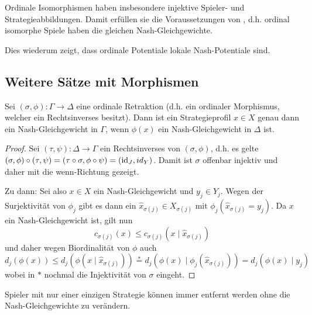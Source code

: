 \begin{bsp}
	Ordinale Isomorphismen haben insbesondere injektive Spieler- und Strategieabbildungen. Damit erfüllen sie die Voraussetzungen von , d.h. ordinal isomorphe Spiele haben die gleichen Nash-Gleichgewichte.
\end{bsp}

Dies wiederum zeigt, dass ordinale Potentiale lokale Nash-Potentiale sind.


\subsection{Weitere Sätze mit Morphismen}



\begin{prop}\label{prop:NGerhalten}
	Sei $(\sigma, \phi): \Gamma \to \Delta$ eine ordinale Retraktion (d.h. ein ordinaler Morphismus, welcher ein Rechtsinverses besitzt). Dann ist ein Strategieprofil $x \in X$ genau dann ein Nash-Gleichgewicht in $\Gamma$, wenn $\phi(x)$ ein Nash-Gleichgewicht in $\Delta$ ist.
\end{prop}

\begin{proof}
	Sei $(\tau, \psi): \Delta \to \Gamma$ ein Rechtsinverses von $(\sigma, \phi)$, d.h. es gelte $(\sigma, \phi) \circ (\tau, \psi) = (\tau\circ\sigma, \phi\circ\psi) = (\mathrm{id}_J, id_Y)$. Damit ist $\sigma$ offenbar injektiv und daher mit  die \glqq wenn\grqq-Richtung gezeigt.
	
	Zu \glqq dann\grqq: Sei also $x \in X$ ein Nash-Gleichgewicht und $y_j \in Y_j$. Wegen der Surjektivität von $\phi_j$ gibt es dann ein $\hat{x}_{\sigma(j)} \in X_{\sigma(j)}$ mit $\phi_j(\hat{x}_{\sigma(j)} = y_j)$. Da $x$ ein Nash-Gleichgewicht ist, gilt nun 
	\[c_{\sigma(j)}(x) \leq c_{\sigma(j)}(x \mid \hat{x}_{\sigma(j)})\]
	und daher wegen Biordinalität von $\phi$ auch 
	\[d_j(\phi(x)) \leq d_j(\phi(x \mid \hat{x}_{\sigma(j)})) \overset{\ast}{=} d_j(\phi(x) \mid \phi_j(\hat{x}_{\sigma(j)})) = d_j(\phi(x) \mid y_j)\]
	wobei in $\ast$ nochmal die Injektivität von $\sigma$ eingeht.
\end{proof}


\begin{bsp}
	Spieler mit nur einer einzigen Strategie können immer entfernt werden ohne die Nash-Gleichgewichte zu verändern. 
	
\end{bsp}


